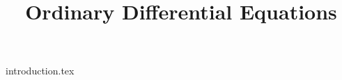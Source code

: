 \documentclass{ode}
\title{Ordinary Differential Equations}
\begin{document}
\maketitle

\tableofcontents


{introduction.tex}


\printbibliography
	
\end{document}
